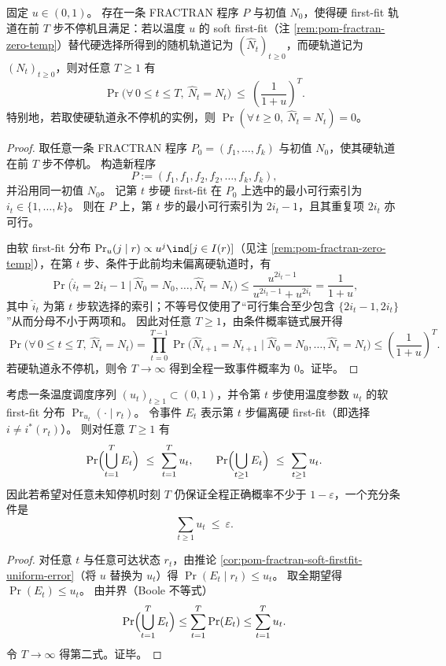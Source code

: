 \begin{theorem}\label{thm:pom-fractran-soft-firstfit-fixed-temp-exponential-collapse}
固定 \(u\in(0,1)\)。
存在一条 FRACTRAN 程序 \(P\) 与初值 \(N_0\)，使得硬 first-fit 轨道在前 \(T\) 步不停机且满足：若以温度 \(u\) 的 soft first-fit（注 \ref{rem:pom-fractran-zero-temp}）替代硬选择所得到的随机轨道记为 \((\widehat N_t)_{t\ge 0}\)，而硬轨道记为 \((N_t)_{t\ge 0}\)，则对任意 \(T\ge 1\) 有
\[
\Pr\!\bigl(\forall\,0\le t\le T,\ \widehat N_t=N_t\bigr)\ \le\ \left(\frac{1}{1+u}\right)^T.
\]
特别地，若取使硬轨道永不停机的实例，则 \(\Pr(\forall\,t\ge 0,\ \widehat N_t=N_t)=0\)。
\end{theorem}
\begin{proof}
取任意一条 FRACTRAN 程序 \(P_0=(f_1,\dots,f_k)\) 与初值 \(N_0\)，使其硬轨道在前 \(T\) 步不停机。
构造新程序
\[
P:=(f_1,f_1,f_2,f_2,\dots,f_k,f_k),
\]
并沿用同一初值 \(N_0\)。
记第 \(t\) 步硬 first-fit 在 \(P_0\) 上选中的最小可行索引为 \(i_t\in\{1,\dots,k\}\)。
则在 \(P\) 上，第 \(t\) 步的最小可行索引为 \(2i_t-1\)，且其重复项 \(2i_t\) 亦可行。

由软 first-fit 分布 \(\Pr_u(j\mid r)\propto u^{j}\ind[j\in I(r)]\)（见注 \ref{rem:pom-fractran-zero-temp}），在第 \(t\) 步、条件于此前均未偏离硬轨道时，有
\[
\Pr\!\bigl(\widehat i_t=2i_t-1\ \big|\ \widehat N_0=N_0,\dots,\widehat N_t=N_t\bigr)
\le
\frac{u^{2i_t-1}}{u^{2i_t-1}+u^{2i_t}}

=\frac{1}{1+u},
\]
其中 \(\widehat i_t\) 为第 \(t\) 步软选择的索引；不等号仅使用了“可行集合至少包含 \(\{2i_t-1,2i_t\}\)”从而分母不小于两项和。
因此对任意 \(T\ge 1\)，由条件概率链式展开得
\[
\Pr\!\bigl(\forall\,0\le t\le T,\ \widehat N_t=N_t\bigr)
=\prod_{t=0}^{T-1}\Pr\!\bigl(\widehat N_{t+1}=N_{t+1}\mid \widehat N_0=N_0,\dots,\widehat N_t=N_t\bigr)
\le\left(\frac{1}{1+u}\right)^T.
\]
若硬轨道永不停机，则令 \(T\to\infty\) 得到全程一致事件概率为 \(0\)。证毕。
\end{proof}

\begin{theorem}[温度预算的全程可靠性上界与输入无关设计准则]\label{thm:pom-fractran-soft-firstfit-annealed-budget}
考虑一条温度调度序列 \((u_t)_{t\ge 1}\subset(0,1)\)，并令第 \(t\) 步使用温度参数 \(u_t\) 的软 first-fit 分布 \(\Pr_{u_t}(\cdot\mid r_t)\)。
令事件 \(E_t\) 表示第 \(t\) 步偏离硬 first-fit（即选择 \(i\neq i^\ast(r_t)\)）。
则对任意 \(T\ge 1\) 有
\[
\Pr\Bigl(\bigcup_{t=1}^{T}E_t\Bigr)\ \le\ \sum_{t=1}^{T}u_t,
\qquad
\Pr\Bigl(\bigcup_{t\ge 1}E_t\Bigr)\ \le\ \sum_{t\ge 1}u_t.
\]
因此若希望对任意未知停机时刻 \(T\) 仍保证全程正确概率不少于 \(1-\varepsilon\)，一个充分条件是
\[
\sum_{t\ge 1}u_t\ \le\ \varepsilon.
\]
\end{theorem}
\begin{proof}
对任意 \(t\) 与任意可达状态 \(r_t\)，由推论 \ref{cor:pom-fractran-soft-firstfit-uniform-error}（将 \(u\) 替换为 \(u_t\)）得
\(\Pr(E_t\mid r_t)\le u_t\)。
取全期望得 \(\Pr(E_t)\le u_t\)。
由并界（Boole 不等式）
\[
\Pr\Bigl(\bigcup_{t=1}^{T}E_t\Bigr)\le \sum_{t=1}^{T}\Pr(E_t)\le \sum_{t=1}^{T}u_t.
\]
令 \(T\to\infty\) 得第二式。证毕。
\end{proof}

